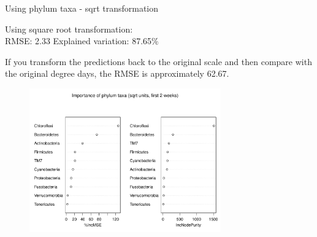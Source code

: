 \documentclass{beamer}
\begin{document}
\begin{frame}{Using phylum taxa - sqrt transformation}
  
  {\scriptsize
    
  \noindent Using square root transformation:\\
  RMSE: 2.33 \hspace{0.05in}  Explained variation: 87.65\%

  \vspace{0.05in}
  
  \noindent If you transform the predictions back to the original
  scale and then compare with the original degree days, the RMSE is
  approximately 62.67.
  
\begin{center}
\begin{figure}
  \includegraphics[width=3.25in]{../only_phyla/first_two_weeks/sqrt_units_first_two_weeks_phyla_imp_plot}
\end{figure}
\end{center}
\vspace{-0.25in}
}
  
\end{frame}
\end{document}
